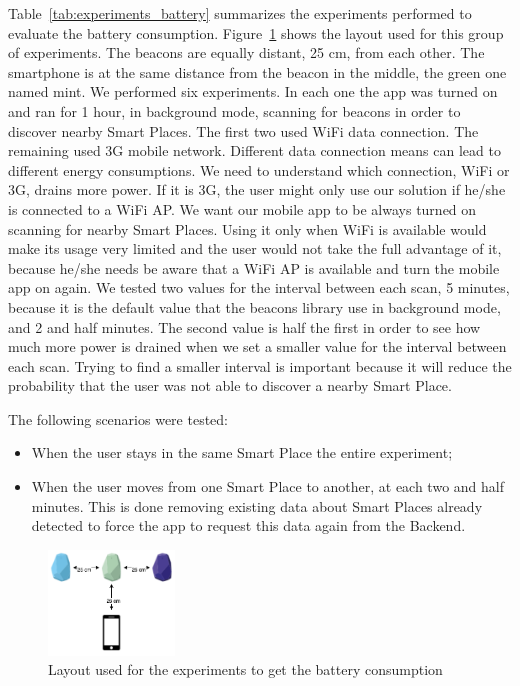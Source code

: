 Table~\ref{tab:experiments_battery} summarizes the experiments performed to evaluate the battery consumption.
Figure~\ref{fig:layout_experiments_battery_consumption} shows the layout used for this group of experiments.
The beacons are equally distant, 25 cm, from each other.
The smartphone is at the same distance from the beacon in the middle, the green one named mint.
We performed six experiments.
In each one the app was turned on and ran for 1 hour, in background mode, scanning for beacons in order to discover nearby Smart Places.
The first two used \gls{WiFi} data connection.
The remaining used \gls{3G} mobile network.
Different data connection means can lead to different energy consumptions.
We need to understand which connection, \gls{WiFi} or \gls{3G}, drains more power.
If it is \gls{3G}, the user might only use our solution if he/she is connected to a \gls{WiFi} \gls{AP}.
We want our mobile app to be always turned on scanning for nearby Smart Places.
Using it only when \gls{WiFi} is available would make its usage very limited and the user would not take the full advantage of it, because he/she needs be aware that a \gls{WiFi} \gls{AP} is available and turn the mobile app on again.
We tested two values for the interval between each scan, 5 minutes, because it is the default value that the beacons library use in background mode, and 2 and half minutes.
The second value is half the first in order to see how much more power is drained when we set a smaller value for the interval between each scan.
Trying to find a smaller interval is important because it will reduce the probability that the user was not able to discover a nearby Smart Place.

The following scenarios were tested:
\begin{itemize}
  \item
  When the user stays in the same Smart Place the entire experiment;
  \item
  When the user moves from one Smart Place to another, at each two and half minutes.
  This is done removing existing data about Smart Places already detected to force the app to request this data again from the Backend.
\end{itemize}



\begin{figure}[!ht]
  \centering
    \includegraphics[width=0.3\textwidth, keepaspectratio]{figures/experiments_battery_layout}
    \caption[Layout for experiments of battery consumption]{Layout used for the experiments to get the battery consumption}
    \label{fig:layout_experiments_battery_consumption}
\end{figure}

